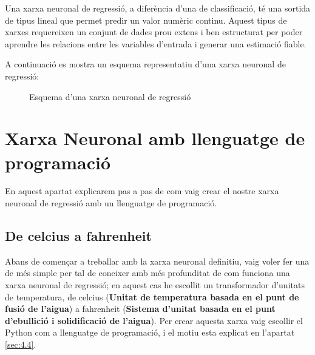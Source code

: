 Una xarxa neuronal de regressió, a diferència d’una de classificació, té una sortida de tipus lineal que permet predir un valor numèric continu. Aquest tipus de xarxes requereixen un conjunt de dades prou extens i ben estructurat per poder aprendre les relacions entre les variables d’entrada i generar una estimació fiable.

A continuació es mostra un esquema representatiu d’una xarxa neuronal de regressió:

\begin{figure}[h!]
\centering
{}
\caption{Esquema d’una xarxa neuronal de regressió}
\end{figure}

\section{Xarxa Neuronal amb llenguatge de programació}\label{sec:10}
En aquest apartat explicarem pas a pas de com vaig crear el nostre xarxa neuronal de regressió amb un llenguatge de programació.

\subsection{De celcius a fahrenheit}

Abans de començar a treballar amb la xarxa neuronal definitiu, vaig voler fer una de més simple per tal de coneixer amb més profunditat de com funciona una xarxa neuronal de regressió; en aquest cas he escollit un transformador d'unitats de temperatura, de celcius (\textbf{Unitat de temperatura basada en el punt de fusió de l'aigua}) a fahrenheit (\textbf{Sistema d'unitat basada en el punt d'ebullició i solidificació de l'aigua}). Per crear aquesta xarxa vaig escollir el Python com a llenguatge de programació, i el motiu esta explicat en l'apartat \ref{sec:4.4}.\\


